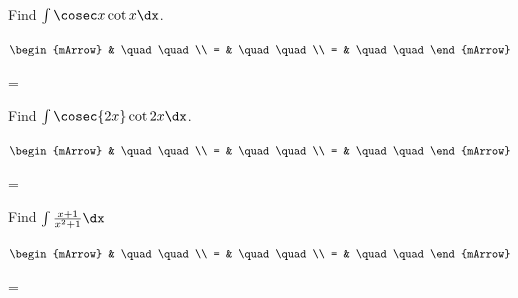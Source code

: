 \begin{mtask}[resume] 

   \task \begin{exercise} Find $\int \cosec x \cot x \dx$.
           \begin{envSolution}
             $\begin{mArrow}
                   & \quad \quad              \\
		   		 = & \quad \quad              \\
				 = & \quad \quad 
              \end{mArrow}$
            \begin{shortsolution}  
			     =$ \quad \quad \quad \quad$
			\end{shortsolution}				 
           \end{envSolution}
         \end{exercise}

   \task \begin{exercise} Find $\int \cosec{2x} \cot{2x} \dx$.
           \begin{envSolution}
             $\begin{mArrow}
                   & \quad \quad              \\
		   		 = & \quad \quad              \\
				 = & \quad \quad 
              \end{mArrow}$
            \begin{shortsolution}  
			     =$ \quad \quad \quad \quad$
			\end{shortsolution}				 
           \end{envSolution}
         \end{exercise}

   \task \begin{exercise} Find $\int \frac{x+1}{x^2+1} \dx$
           \begin{envSolution}
             $\begin{mArrow}
                   & \quad \quad              \\
		   		 = & \quad \quad              \\
				 = & \quad \quad 
              \end{mArrow}$
            \begin{shortsolution}  
			     =$ \quad \quad \quad \quad$
			\end{shortsolution}				 
           \end{envSolution}
         \end{exercise}


\end{mtask}
